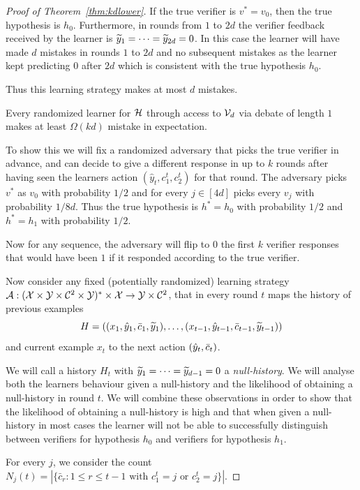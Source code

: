 \documentclass[11pt,letterpaper]{article}
\theoremstyle{definition}
\theoremstyle{plain}
\begin{document}
\begin{proof}[Proof of Theorem~\ref{thm:kdlower}]
If the true verifier is $v^* = v_0$, then the true hypothesis is $h_0$. Furthermore, in rounds from $1$ to $2d$ the verifier feedback received by the learner is ${\widetilde{y}}_1 = \dots = {\widetilde{y}}_{2d} = 0$.
In this case the learner will have made $d$ mistakes in rounds $1$ to $2d$ and no subsequent mistakes as the learner kept predicting $0$ after $2d$ which is consistent with the true hypothesis $h_0$.

Thus this learning strategy makes at most $d$ mistakes.

\begin{claim}
    Every randomized learner for ${{\mathcal H}}$ through access to ${\mathcal V}_d$ via debate of length $1$ makes at least $\Omega(kd)$ mistake in expectation. 
\end{claim}

To show this we will fix a randomized adversary that picks the true verifier in advance, and can decide to give a different response in up to $k$ rounds after having seen the learners action $(\hat{y}_t, c_1^t, c_2^t)$ for that round. 
The adversary picks $v^*$ as $v_0$ with probability $1/2$ and for every $j\in [4d]$ picks every $v_j$ with probability $1/8d$.
Thus the true hypothesis is $h^* = h_0$ with probability $1/2$ and $h^* = h_1$ with probability $1/2$.

Now for any sequence, the adversary will flip to $0$ the first $k$ verifier responses that would have been $1$ if it responded according to the true verifier. 


Now consider any fixed (potentially randomized) learning  strategy $\mathcal{A}: ({\mathcal X} \times {\mathcal Y}\times {{\mathcal C}}^2 \times {\mathcal Y})^*\times {\mathcal X} \to {\mathcal Y} \times {{\mathcal C}}^2$, that in every round $t$ maps the history of previous examples
\[
H = ((x_1, {\hat{y}}_1, \bar{c}_1, {\widetilde{y}}_1 ), \dots, (x_{t-1}, {\hat{y}}_{t-1}, \bar{c}_{t-1}, {\widetilde{y}}_{t-1} ))
\]
and current example $x_t$ to the next action $({\hat{y}}_t, \bar{c}_t)$.

We will call a history $H_{t}$ with ${\widetilde{y}}_1 = \dots  = {\widetilde{y}}_{d-1} = 0$ a \emph{null-history}. We will analyse both the learners behaviour given a null-history and the likelihood of obtaining a null-history in round $t$. We will combine these observations in order to show that the likelihood of obtaining a null-history is high and that when given a null-history in most cases the learner will not be able to successfully distinguish between verifiers for hypothesis $h_0$ and verifiers for hypothesis $h_1$.

For every $j$, we consider the count $N_j(t) = |\{\bar{c}_r: 1\leq r \leq t-1 \text{ with } c_1^t=j \text{ or } c_2^t=j\}|$.


\end{proof}
\end{document}
